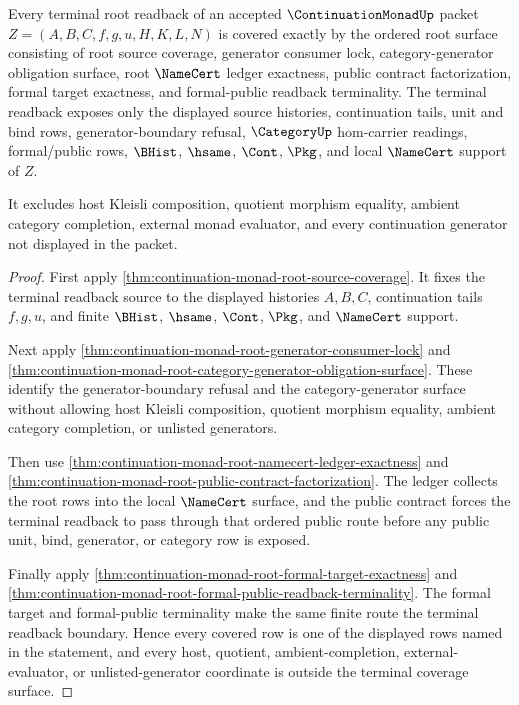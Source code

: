 \begin{theorem}
\label{thm:continuation-monad-root-terminal-readback-coverage}
Every terminal root readback of an accepted $\ContinuationMonadUp$ packet
$Z=(A,B,C,f,g,u,H,K,L,N)$ is covered exactly by the ordered root surface
consisting of root source coverage, generator consumer lock, category-generator
obligation surface, root $\NameCert$ ledger exactness, public contract
factorization, formal target exactness, and formal-public readback
terminality. The terminal readback exposes only the displayed source histories,
continuation tails, unit and bind rows, generator-boundary refusal,
$\CategoryUp$ hom-carrier readings, formal/public rows, $\BHist$, $\hsame$,
$\Cont$, $\Pkg$, and local $\NameCert$ support of $Z$.

It excludes host Kleisli composition, quotient morphism equality, ambient
category completion, external monad evaluator, and every continuation
generator not displayed in the packet.
\end{theorem}
\begin{proof}
First apply \autoref{thm:continuation-monad-root-source-coverage}. It fixes
the terminal readback source to the displayed histories $A,B,C$, continuation
tails $f,g,u$, and finite $\BHist$, $\hsame$, $\Cont$, $\Pkg$, and
$\NameCert$ support.

Next apply \autoref{thm:continuation-monad-root-generator-consumer-lock} and
\autoref{thm:continuation-monad-root-category-generator-obligation-surface}.
These identify the generator-boundary refusal and the category-generator
surface without allowing host Kleisli composition, quotient morphism equality,
ambient category completion, or unlisted generators.

Then use \autoref{thm:continuation-monad-root-namecert-ledger-exactness} and
\autoref{thm:continuation-monad-root-public-contract-factorization}. The
ledger collects the root rows into the local $\NameCert$ surface, and the
public contract forces the terminal readback to pass through that ordered
public route before any public unit, bind, generator, or category row is
exposed.

Finally apply \autoref{thm:continuation-monad-root-formal-target-exactness}
and \autoref{thm:continuation-monad-root-formal-public-readback-terminality}.
The formal target and formal-public terminality make the same finite route the
terminal readback boundary. Hence every covered row is one of the displayed
rows named in the statement, and every host, quotient, ambient-completion,
external-evaluator, or unlisted-generator coordinate is outside the terminal
coverage surface.
\end{proof}
